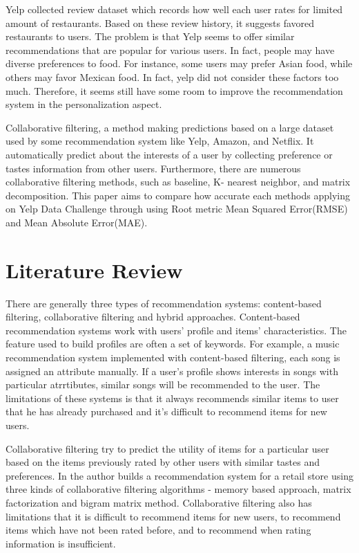 \documentclass{llncs}
\begin{document}
Yelp collected review dataset which records how well each user rates for limited amount of restaurants. Based on these review history, it suggests favored restaurants to users. The problem is that Yelp seems to offer similar recommendations that are popular for various users. In fact, people may have diverse preferences to food. For instance, some users may prefer Asian food, while others may favor Mexican food. In fact, yelp did not consider these factors too much. Therefore, it seems still have some room to improve the recommendation system in the personalization aspect.

Collaborative filtering, a method making predictions based on a large dataset used by some recommendation system like Yelp, Amazon, and Netflix. It automatically predict about the interests of a user by collecting preference or tastes information from other users. Furthermore, there are numerous collaborative filtering methods, such as baseline, K- nearest neighbor, and matrix decomposition. This paper aims to compare how accurate each methods applying on Yelp Data Challenge through using Root metric Mean Squared Error(RMSE) and Mean Absolute Error(MAE).

\section{Literature Review}
There are generally three types of recommendation systems: content-based filtering, collaborative filtering and hybrid approaches. Content-based recommendation systems work with users’ profile and items’ characteristics. The feature used to build profiles are often a set of keywords. For example, a music recommendation system\cite{MJ} implemented with content-based filtering, each song is assigned an attribute manually. If a user’s profile shows interests in songs with particular atrrtibutes, similar songs will be recommended to the user. The limitations of these systems is that it always recommends similar items to user that he has already purchased and it’s difficult to recommend items for new users. 

Collaborative filtering try to predict the utility of items for a particular user based on the items previously rated by other users with similar tastes and preferences. In\cite{Bruno} the author builds a recommendation system for a retail store using three kinds of collaborative filtering algorithms - memory based approach, matrix factorization and bigram matrix method. Collaborative filtering also has limitations that it is difficult to recommend items for new users, to recommend items which have not been rated before, and to recommend when rating information is insufficient. 
\end{document}
